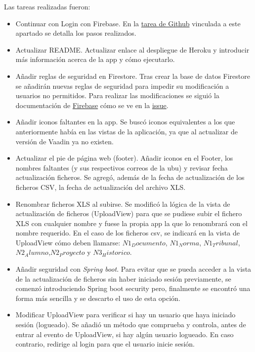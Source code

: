 Las tareas realizadas fueron:
\begin{itemize}
	\tightlist
	\item Continuar con Login con Firebase.
		En la \href{https://github.com/dbo1001/Gestor-TFG-2021/issues/122}{tarea de Github} vinculada a este apartado se detalla los pasos realizados.
	\item Actualizar README.
		Actualizar enlace al despliegue de Heroku y introducir más información acerca de la app y cómo ejecutarlo.
	\item Añadir reglas de seguridad en Firestore.
		Tras crear la base de datos Firestore se añadirán nuevas reglas de seguridad para impedir su modificación a usuarios no permitidos. Para realizar las modificaciones se siguió la documentación de \href{https://firebase.google.com/docs/firestore/security/insecure-rules}{Firebase} cómo se ve en la \href{https://github.com/dbo1001/Gestor-TFG-2021/issues/130}{issue}.
	\item Añadir iconos faltantes en la app.
		Se buscó iconos equivalentes a los que anteriormente había en las vistas de la aplicación, ya que al actualizar de versión de Vaadin ya no existen.
	\item Actualizar el pie de página web (footer).
		Añadir iconos en el Footer, los nombres faltantes (y sus respectivos correos de la ubu) y revisar fecha actualización ficheros. Se agregó, además de la fecha de actualización de los ficheros CSV, la fecha de actualización del archivo XLS.
	\item Renombrar ficheros XLS al subirse.
		Se modificó la lógica de la vista de actualización de ficheros (UploadView) para que se pudiese subir el fichero XLS con cualquier nombre y fuese la propia app la que lo renombrará con el nombre requerido. En el caso de los ficheros csv, se indicará en la vista de UploadView cómo deben llamarse: $N1_Documento$, $N1_Norma$, $N1_Tribunal$,$N2_Alumno$,$N2_Proyecto$ y $N3_Historico$.
	\item Añadir seguridad con \emph{Spring boot}.
		Para evitar que se pueda acceder a la vista de la actualización de ficheros sin haber iniciado sesión previamente, se comenzó introduciendo Spring boot security pero, finalmente se encontró una forma más sencilla y se descarto el uso de esta opción.
	\item Modificar UploadView para verificar si hay un usuario que haya iniciado sesión (logueado).
		Se añadió un método que comprueba y controla, antes de entrar al evento de UploadView, si hay algún usuario logueado. En caso contrario, redirige al login para que el usuario inicie sesión. 
	
\end{itemize}

